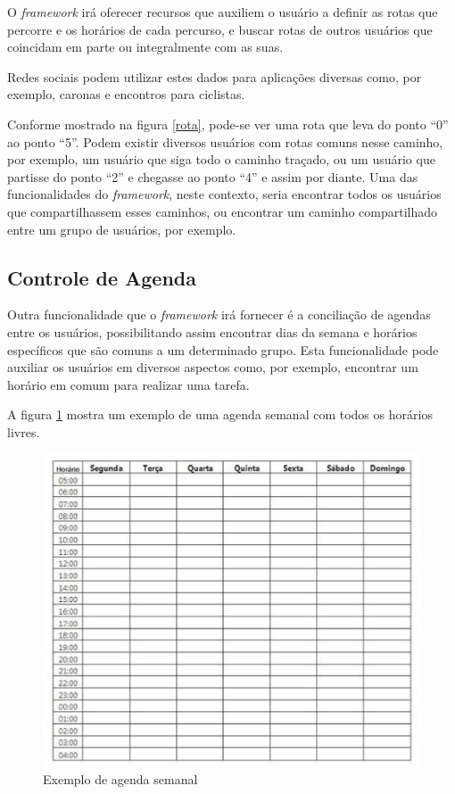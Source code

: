 O \textit{framework} irá oferecer recursos que auxiliem o usuário a definir as rotas que percorre e os horários de cada percurso, e buscar rotas de outros usuários que coincidam em parte ou integralmente com as suas.

Redes sociais podem utilizar estes dados para aplicações diversas como, por exemplo, caronas e encontros para ciclistas.

Conforme mostrado na figura \ref{rota}, pode-se ver uma rota que leva do ponto ``0'' ao ponto ``5''. Podem existir diversos usuários com rotas comuns nesse caminho, por exemplo, um usuário que siga todo o caminho traçado, ou um usuário que partisse do ponto ``2'' e chegasse ao ponto ``4'' e assim por diante. Uma das funcionalidades do \textit{framework}, neste contexto, seria encontrar todos os usuários que compartilhassem esses caminhos, ou encontrar um caminho compartilhado entre um grupo de usuários, por exemplo.

\subsection{Controle de Agenda}

Outra funcionalidade que o \textit{framework} irá fornecer é a conciliação de agendas entre os usuários, possibilitando assim encontrar dias da semana e horários específicos que são comuns a um determinado grupo. Esta funcionalidade pode auxiliar os usuários em diversos aspectos como, por exemplo, encontrar um horário em comum para realizar uma tarefa.

A figura \ref{agenda semanal} mostra um exemplo de uma agenda semanal com todos os horários livres.

\begin{figure}[!h]
	\centering
	\includegraphics[scale=0.55]{figuras/capitulo5/agenda_semanal.eps}
	\caption[Exemplo de agenda semanal]{Exemplo de agenda semanal\footnotemark}
	\label{agenda semanal}
\end{figure}

